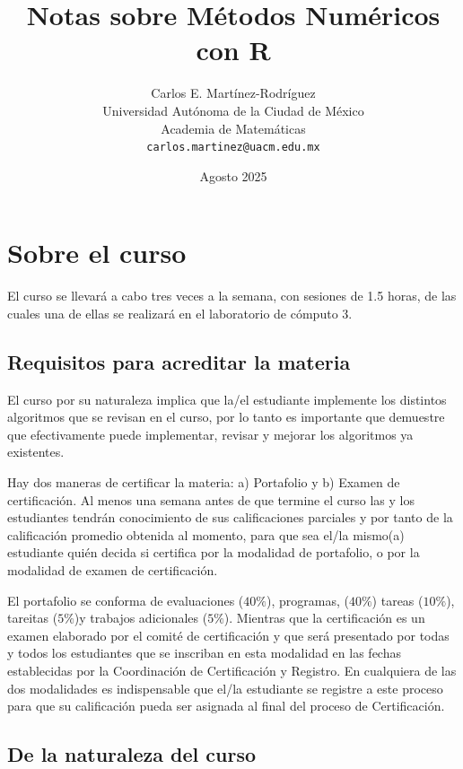 \documentclass[12pt]{article}
\title{Notas sobre Métodos Numéricos con R}
\author{
Carlos E. Martínez-Rodríguez \\
Universidad Autónoma de la Ciudad de México \\
Academia de Matemáticas \\
\texttt{carlos.martinez@uacm.edu.mx}
}
\date{Agosto 2025}
\date{}
\begin{document}
\maketitle
\tableofcontents

\section{Sobre el curso}

El curso se llevará a cabo tres veces a la semana,  con sesiones de 1.5 horas,  de las cuales una de ellas se realizará en el laboratorio de cómputo 3.

\subsection{Requisitos para acreditar la materia}

El curso por su naturaleza implica que la/el estudiante implemente los distintos algoritmos que se revisan en el curso,  por lo tanto es importante que demuestre que efectivamente puede implementar, revisar y mejorar los algoritmos ya existentes.\bigskip

Hay dos maneras de certificar la materia: a) Portafolio y b) Examen de certificación.  Al menos una semana antes de que termine el curso las y los estudiantes tendrán conocimiento de sus calificaciones parciales y por tanto de la calificación promedio obtenida al momento, para que sea el/la mismo(a) estudiante quién decida si certifica por la modalidad de portafolio,  o por la modalidad de examen de certificación.\bigskip


El portafolio se conforma de evaluaciones ($40\%$), programas, ($40\%$) tareas ($10\%$), tareitas ($5\%$)y trabajos adicionales ($5\%$). Mientras que la certificación es un examen elaborado por el comité de certificación y que será presentado por todas y todos los estudiantes que se inscriban en esta modalidad en las fechas establecidas por la Coordinación de Certificación y Registro.  En cualquiera de las dos modalidades es indispensable que el/la estudiante se registre a este proceso para que su calificación pueda ser asignada al final del proceso de Certificación.

\subsection{De la naturaleza del curso}
\end{document}
